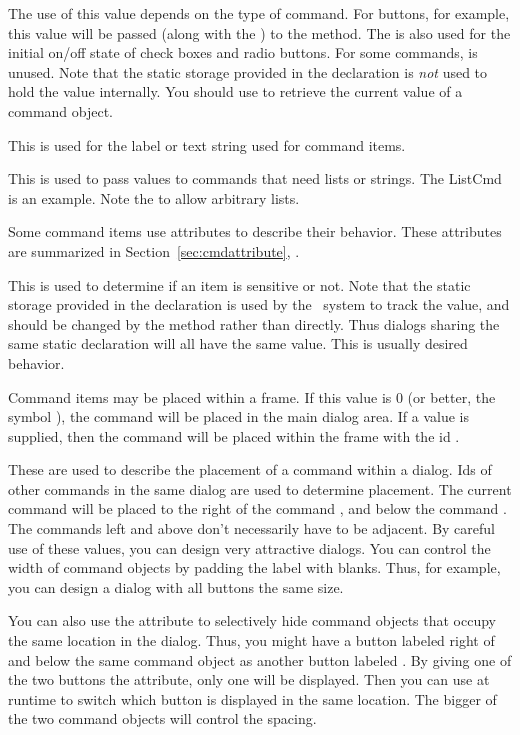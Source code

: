  The use of this value depends on the type
of command. For buttons, for example, this value will be passed
(along with the ) to the  method.
The  is also used for the initial on/off state of check
boxes and radio buttons. For some commands,  is
unused. Note that the static storage provided in the declaration
is \emph{not} used to hold the value internally. You should
use  to retrieve the current value of a
command object.

 This is used for the label or text string
used for command items.

 This is used to pass values to commands
that need lists or strings. The ListCmd is an example. Note the
 to allow arbitrary lists.

 Some command items use attributes
to describe their behavior.  These attributes are summarized
in Section~\ref{sec:cmdattribute}, .

 This is used to determine if an item is
sensitive or not. Note that the static storage provided in the
declaration is used by the \V\ system to track the value, and
should be changed by the  method rather than
directly. Thus dialogs sharing the same static declaration will
all have the same value. This is usually desired behavior.

 Command items may be placed within a frame.
If this value is 0 (or better, the symbol ), the
command will be placed in the main dialog area. If a value is
supplied, then the command will be placed within the frame with
the id .

 These are used to describe
the placement of a command within a dialog.  Ids of other commands
in the same dialog are used to determine placement. The current
command will be placed to the right of the command ,
and below the command . The commands left and above
don't necessarily have to be adjacent. By careful use of these
values, you can design very attractive dialogs. You can control
the width of command objects by padding the label with blanks.
Thus, for example, you can design a dialog with all buttons the
same size.

You can also use the  attribute to selectively
hide command objects that occupy the same location in the
dialog. Thus, you might have a button labeled 
right of and below the same command object as another button
labeled . By giving one of the two buttons
the  attribute, only one will be displayed.
Then you can use  at runtime to switch which
button is displayed in the same location. The bigger of the
two command objects will control the spacing.

